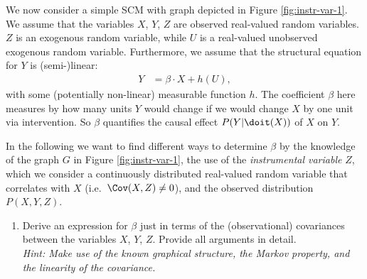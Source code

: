 We now consider a simple SCM with graph depicted in Figure \ref{fig:instr-var-1}. We assume that the variables $X$, $Y$, $Z$ are observed real-valued random variables. $Z$ is an exogenous random variable, while $U$ is a real-valued unobserved exogenous random variable. 
Furthermore, we assume that the structural equation for $Y$ is (semi-)linear:
\begin{align*}
    Y &=  \beta \cdot X + h(U),
\end{align*}
with some (potentially non-linear) measurable function $h$.
The coefficient $\beta$ here measures by how many units $Y$ would change if we would change $X$ by one unit via intervention. So $\beta$ quantifies the causal effect $P(Y|\doit(X))$ of $X$ on $Y$.

In the following we want to find different ways to determine $\beta$ by the knowledge of the graph $G$ in Figure \ref{fig:instr-var-1}, the use of the \emph{instrumental variable} $Z$, which we consider a continuously distributed real-valued random variable that correlates with $X$ (i.e.\ $\Cov(X,Z) \neq 0$), and the observed distribution $P(X,Y,Z)$.

\begin{enumerate}[resume*]
    \item Derive an expression for $\beta$ just in terms of the (observational) covariances between the variables $X$, $Y$, $Z$. Provide all arguments in detail. \\ 
      \emph{Hint: Make use of the known graphical structure, the Markov property, and the linearity of the covariance.}
     \label{ex:instrumental_variables_beta}
\end{enumerate}

